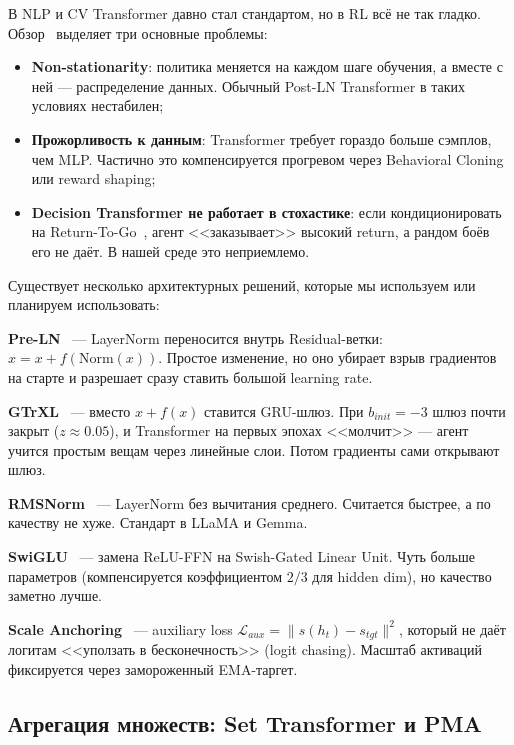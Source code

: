 \documentclass[a4paper,12pt]{extarticle}
\begin{document}
В NLP и CV Transformer давно стал стандартом, но в RL всё не так гладко. Обзор~\cite{survey_trl} выделяет три основные проблемы:

\begin{itemize}[noitemsep]
  \item \textbf{Non-stationarity}: политика меняется на каждом шаге обучения, а вместе с ней --- распределение данных. Обычный Post-LN Transformer в таких условиях нестабилен;
  \item \textbf{Прожорливость к данным}: Transformer требует гораздо больше сэмплов, чем MLP. Частично это компенсируется прогревом через Behavioral Cloning или reward shaping;
  \item \textbf{Decision Transformer не работает в стохастике}: если кондиционировать на Return-To-Go~\cite{odt}, агент <<заказывает>> высокий return, а рандом боёв его не даёт. В нашей среде это неприемлемо.
\end{itemize}

Существует несколько архитектурных решений, которые мы используем или планируем использовать:

\textbf{Pre-LN}~\cite{preln} --- LayerNorm переносится внутрь Residual-ветки: $x = x + f(\text{Norm}(x))$. Простое изменение, но оно убирает взрыв градиентов на старте и разрешает сразу ставить большой learning rate.

\textbf{GTrXL}~\cite{gtrxl} --- вместо $x + f(x)$ ставится GRU-шлюз. При $b_{init} = -3$ шлюз почти закрыт ($z \approx 0.05$), и Transformer на первых эпохах <<молчит>> --- агент учится простым вещам через линейные слои. Потом градиенты сами открывают шлюз.

\textbf{RMSNorm}~\cite{rmsnorm} --- LayerNorm без вычитания среднего. Считается быстрее, а по качеству не хуже. Стандарт в LLaMA и Gemma.

\textbf{SwiGLU}~\cite{swiglu} --- замена ReLU-FFN на Swish-Gated Linear Unit. Чуть больше параметров (компенсируется коэффициентом $2/3$ для hidden dim), но качество заметно лучше.

\textbf{Scale Anchoring}~\cite{scale_anchoring} --- auxiliary loss $\mathcal{L}_{aux} = \|s(h_t) - s_{tgt}\|^2$, который не даёт логитам <<уползать в бесконечность>> (logit chasing). Масштаб активаций фиксируется через замороженный EMA-таргет.

\subsection{Агрегация множеств: Set Transformer и PMA}
\end{document}
